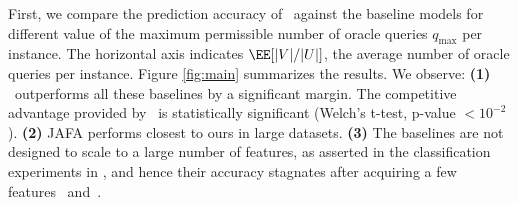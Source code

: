 \documentclass[letterpaper]{article}
\renewcommand{\cite}{\citep}
\begin{document}
 First, we compare the prediction accuracy of \our\ against
 the baseline models for different
 value of the maximum permissible number of oracle queries $q_{\max}$ per instance. The horizontal axis indicates $\EE[|V|/|U|]$, the average number of oracle queries per instance.
Figure \ref{fig:main} summarizes the results.
We observe:
\textbf{(1)} \our\ outperforms all these baselines by a significant margin.
The competitive advantage provided by \our\ is statistically significant (Welch's t-test, p-value $< 10^{-2}$). \textbf{(2)} JAFA performs closest to ours in large datasets. \textbf{(3)} The baselines are not designed to scale to a large number of features, as asserted in the classification experiments in \cite{gsm}, and hence their accuracy stagnates after acquiring a few features~\cite[Fig. 6, 7]{gsm} and~\cite[Fig. 3]{jafa}.
\end{document}
